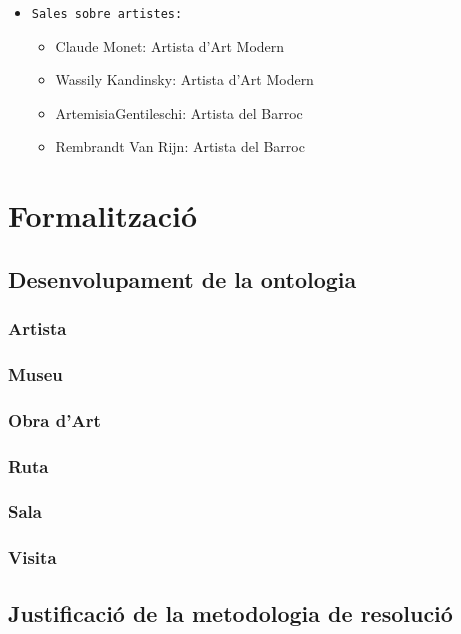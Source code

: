 \documentclass[a4paper]{article}
\begin{document}
	\begin{itemize}
		\item \texttt{Sales sobre artistes: } 
		\begin{itemize}
			\item Claude Monet: Artista d'Art Modern
			\item Wassily Kandinsky: Artista d'Art Modern
			\item ArtemisiaGentileschi: Artista del Barroc
			\item Rembrandt Van Rijn: Artista del Barroc
		\end{itemize}
	\end{itemize}
	
	\newpage
	\section{Formalització}
	
	\subsection{Desenvolupament de la ontologia}
	
	\subsubsection*{Artista}
	
	\subsubsection*{Museu}
	
	\subsubsection*{Obra d'Art}
	
	\subsubsection*{Ruta}
	
	\subsubsection*{Sala}
	
	\subsubsection*{Visita}
	
	\subsection{Justificació de la metodologia de resolució}
	
\end{document}
